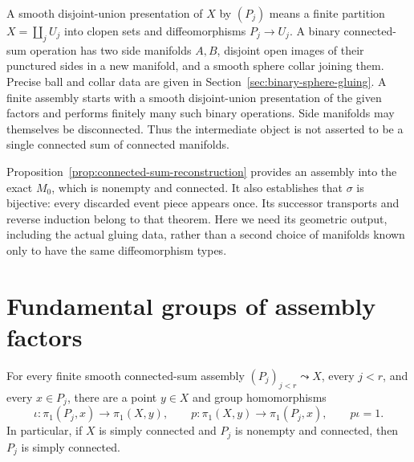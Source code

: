 A smooth disjoint-union presentation of $X$ by $(P_j)$ means a finite
partition $X=\coprod_j U_j$ into clopen sets and diffeomorphisms $P_j\to U_j$.
A binary connected-sum operation has two side manifolds $A,B$, disjoint
open images of their punctured sides in a new manifold, and a smooth
sphere collar joining them.  Precise ball and collar data are given in
Section~\ref{sec:binary-sphere-gluing}.  A finite assembly starts with a
smooth disjoint-union presentation of the given factors and performs
finitely many such binary operations.  Side manifolds may themselves be
disconnected.  Thus the intermediate object is not asserted to be a single
connected sum of connected manifolds.

Proposition~\ref{prop:connected-sum-reconstruction} provides an assembly into the exact $M_0$,
which is nonempty and connected.  It also establishes that $\sigma$ is
bijective: every discarded event piece appears once.  Its successor
transports and reverse induction belong to that theorem.  Here we need its
geometric output, including the actual gluing data, rather than a second
choice of manifolds known only to have the same diffeomorphism types.

\section{Fundamental groups of assembly factors}
\label{sec:factor-fundamental-groups}

\begin{lemma}
\label{lem:sphere-factor-retraction}
For every finite smooth connected-sum assembly $(P_j)_{j<r}\leadsto X$,
every $j<r$, and every $x\in P_j$, there are a point $y\in X$ and group
homomorphisms
\[
 \iota:\pi_1(P_j,x)\longrightarrow\pi_1(X,y),\qquad
 p:\pi_1(X,y)\longrightarrow\pi_1(P_j,x),\qquad p\iota=1.
\]
In particular, if $X$ is simply connected and $P_j$ is nonempty and connected, then
$P_j$ is simply connected.
\end{lemma}

